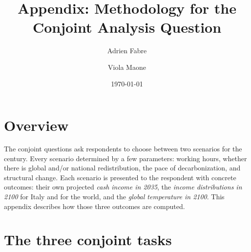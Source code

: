 \documentclass[12pt,a4paper]{article}
\newcommand{\file}[1]{\texttt{#1}}
\begin{document}
\title{Appendix: Methodology for the Conjoint Analysis Question}
\author{Adrien Fabre \and Viola Maone}
\date{\today}
\maketitle
\tableofcontents
\bigskip

\section{Overview}
\label{sec:overview}

The conjoint questions ask respondents to choose between two scenarios for the century. Every scenario determined by a few parameters: working hours, whether there is global and/or national redistribution, the pace of decarbonization, and structural change. Each scenario is presented to the respondent with concrete outcomes: their own projected \emph{cash income in 2035}, the \emph{income distributions in 2100} for Italy and for the world, and the \emph{global temperature in 2100}.
This appendix describes how those three outcomes are computed. 


\section{The three conjoint tasks}
\label{sec:tasks}
\end{document}
